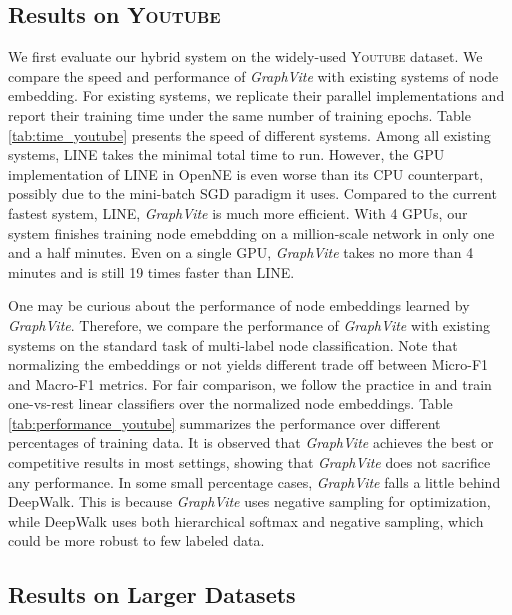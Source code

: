 \documentclass[sigconf]{acmart}
\newcommand{\dataset}[1]{\textsc{#1}\xspace}
\newcommand{\Graphy}{\textit{GraphVite}\xspace}
\begin{document}
\subsection{Results on \dataset{Youtube}}

We first evaluate our hybrid system on the widely-used \dataset{Youtube} dataset. We compare the speed and performance of \Graphy with existing systems of node embedding. For existing systems, we replicate their parallel implementations and report their training time under the same number of training epochs. Table \ref{tab:time_youtube} presents the speed of different systems. Among all existing systems, LINE \cite{tang2015line} takes the minimal total time to run. However, the GPU implementation of LINE in OpenNE is even worse than its CPU counterpart, possibly due to the mini-batch SGD paradigm it uses. Compared to the current fastest system, LINE, \Graphy is much more efficient. With 4 GPUs, our system finishes training node emebdding on a million-scale network in only one and a half minutes. Even on a single GPU, \Graphy takes no more than 4 minutes and is still 19 times faster than LINE.

One may be curious about the performance of node embeddings learned by \Graphy. Therefore, we compare the performance of \Graphy with existing systems on the standard task of multi-label node classification. Note that normalizing the embeddings or not yields different trade off between Micro-F1 and Macro-F1 metrics. For fair comparison, we follow the practice in \cite{tang2015line} and train one-vs-rest linear classifiers over the normalized node embeddings. Table \ref{tab:performance_youtube} summarizes the performance over different percentages of training data. It is observed that \Graphy achieves the best or competitive results in most settings, showing that \Graphy does not sacrifice any performance. In some small percentage cases, \Graphy falls a little behind DeepWalk. This is because \Graphy uses negative sampling for optimization, while DeepWalk uses both hierarchical softmax and negative sampling, which could be more robust to few labeled data.

\subsection{Results on Larger Datasets}
\end{document}
